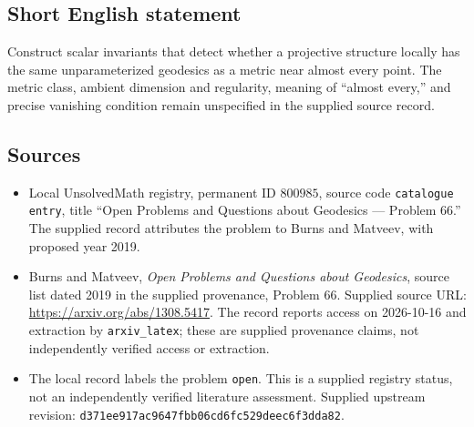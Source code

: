 \documentclass[11pt]{article}
\begin{document}
\subsection{Short English statement}
Construct scalar invariants that detect whether a projective structure locally has the same unparameterized geodesics as a metric near almost every point. The metric class, ambient dimension and regularity, meaning of ``almost every,'' and precise vanishing condition remain unspecified in the supplied source record.
\subsection{Sources}
\begin{itemize}
\item Local UnsolvedMath registry, permanent ID \(800985\), source code \texttt{catalogue entry}, title ``Open Problems and Questions about Geodesics --- Problem 66.'' The supplied record attributes the problem to Burns and Matveev, with proposed year 2019.
\item Burns and Matveev, \emph{Open Problems and Questions about Geodesics}, source list dated 2019 in the supplied provenance, Problem 66. Supplied source URL: \url{https://arxiv.org/abs/1308.5417}. The record reports access on 2026-10-16 and extraction by \texttt{arxiv\_latex}; these are supplied provenance claims, not independently verified access or extraction.
\item The local record labels the problem \texttt{open}. This is a supplied registry status, not an independently verified literature assessment. Supplied upstream revision: \texttt{d371ee917ac9647fbb06cd6fc529deec6f3dda82}.
\end{itemize}
\end{document}
